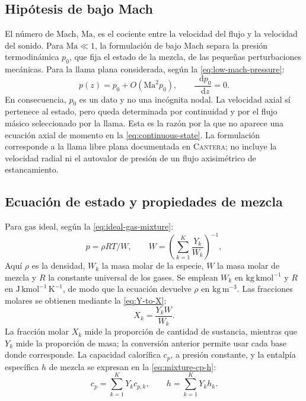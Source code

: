 \documentclass[12pt,a4paper,twoside,openany]{book}
\newcommand{\dd}{\mathop{}\!\mathrm{d}}
\newcommand{\Cantera}{\textsc{Cantera}\xspace}
\begin{document}
\subsection{Hipótesis de bajo Mach}

El número de Mach, \(\mathrm{Ma}\), es el cociente entre la velocidad del
flujo y la velocidad del sonido. Para \(\mathrm{Ma}\ll1\), la formulación
de bajo Mach separa la presión termodinámica \(p_0\), que fija el
estado de la mezcla, de las pequeñas perturbaciones mecánicas. Para la llama
plana considerada, según la \cref{eq:low-mach-pressure}:
\begin{equation}
  p(z)=p_0+O(\mathrm{Ma}^2p_0),
  \qquad \frac{\dd p_0}{\dd z}=0.
  \label{eq:low-mach-pressure}
\end{equation}
En consecuencia, \(p_0\) es un dato y no una incógnita nodal. La velocidad axial
sí pertenece al estado, pero queda determinada por continuidad y por el flujo
másico seleccionado por la llama. Esta es la razón por la que no aparece una
ecuación axial de momento en la \cref{eq:continuous-state}. La formulación corresponde a la llama libre plana documentada en
\Cantera \cite{CanteraDocs32}; no incluye la velocidad radial ni el
autovalor de presión de un flujo axisimétrico de estancamiento.

\subsection{Ecuación de estado y propiedades de mezcla}

Para gas ideal, según la \cref{eq:ideal-gas-mixture}:
\begin{equation}
  p=\rho R T/W,
  \qquad
  W=\left(\sum_{k=1}^{K}\frac{Y_k}{W_k}\right)^{-1},
  \label{eq:ideal-gas-mixture}
\end{equation}
Aquí \(\rho\) es la densidad, \(W_k\) la masa molar de la especie,
\(W\) la masa molar de mezcla y \(R\) la constante universal de los gases.
Se emplean \(W_k\) en \(\mathrm{kg\,kmol^{-1}}\) y
\(R\) en \(\mathrm{J\,kmol^{-1}\,K^{-1}}\), de modo que la ecuación
devuelve \(\rho\) en \(\mathrm{kg\,m^{-3}}\). Las
fracciones molares se obtienen mediante la \cref{eq:Y-to-X}:
\begin{equation}
  X_k=\frac{Y_k W}{W_k}.
  \label{eq:Y-to-X}
\end{equation}
La fracción molar \(X_k\) mide la proporción de cantidad de sustancia, mientras
que \(Y_k\) mide la proporción de masa; la conversión anterior permite usar
cada base donde corresponde. La capacidad calorífica \(c_p\), a presión
constante, y la entalpía específica \(h\) de mezcla se expresan en la \cref{eq:mixture-cp-h}:
\begin{equation}
  c_p=\sum_{k=1}^{K}Y_k c_{p,k},
  \qquad
  h=\sum_{k=1}^{K}Y_k h_k.
  \label{eq:mixture-cp-h}
\end{equation}
\end{document}
